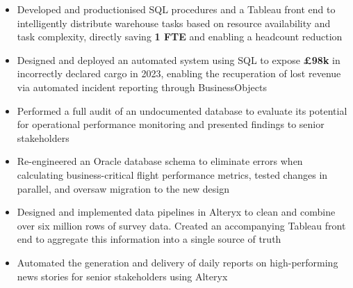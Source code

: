 \begin{paracol}{2}
\begin{itemize}

\medskip
{}

\end{itemize}

\divider

\begin{itemize}
\item Developed and productionised SQL procedures and a Tableau front end to intelligently distribute warehouse tasks based on resource availability and task complexity, directly saving \textbf{1 FTE} and enabling a headcount reduction
\item Designed and deployed an automated system using SQL to expose \textbf{£98k} in incorrectly declared cargo in 2023, enabling the recuperation of lost revenue via automated incident reporting through BusinessObjects
\item Performed a full audit of an undocumented database to evaluate its potential for operational performance monitoring and presented findings to senior stakeholders
\item Re-engineered an Oracle database schema to eliminate errors when calculating business-critical flight performance metrics, tested changes in parallel, and oversaw migration to the new design

\medskip
{}

\end{itemize}

\divider

\begin{itemize}
\item Designed and implemented data pipelines in Alteryx to clean and combine over six million rows of survey data. Created an accompanying Tableau front end to aggregate this information into a single source of truth
\item Automated the generation and delivery of daily reports on high-performing news stories for senior stakeholders using Alteryx


\end{itemize}
\end{paracol}

